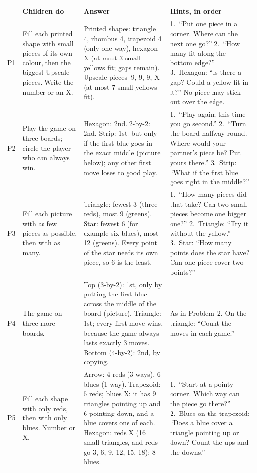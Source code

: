 \documentclass[10pt]{article}
\newcommand{\core}{\newline{\footnotesize core}}
\newcommand{\more}{\newline{\footnotesize further}}
\begin{document}
\needspace{2.5in}
{\small
\begin{xltabular}{\linewidth}{L{0.42in} L{1.45in} Y Y}
\toprule
& \textbf{Children do} & \textbf{Answer} & \textbf{Hints, in order}\\
\midrule
P1\core & Fill each printed shape with small pieces of its own colour, then the biggest Upscale pieces. Write the number or an X. &
Printed shapes: triangle 4, rhombus 4, trapezoid 4 (only one way), hexagon X (at most 3 small yellows fit; gaps remain).
Upscale pieces: 9, 9, 9, X (at most 7 small yellows fit). &
1.~``Put one piece in a corner. Where can the next one go?''
2.~``How many fit along the bottom edge?''
3.~Hexagon: ``Is there a gap? Could a yellow fit in it?'' No piece may stick out over the edge.\\
P2\core & Play the game on three boards; circle the player who can always win. &
Hexagon: 2nd. 2-by-2: 2nd. Strip: 1st, but only if the first blue goes in the exact middle (picture below); any other first move loses to good play. &
1.~``Play again; this time you go second.''
2.~``Turn the board halfway round. Where would your partner's piece be? Put yours there.''
3.~Strip: ``What if the first blue goes right in the middle?''\\
P3\core & Fill each picture with as few pieces as possible, then with as many. &
Triangle: fewest 3 (three reds), most 9 (greens).
Star: fewest 6 (for example six blues), most 12 (greens). Every point of the star needs its own piece, so 6 is the least. &
1.~``How many pieces did that take? Can two small pieces become one bigger one?''
2.~Triangle: ``Try it without the yellow.''
3.~Star: ``How many points does the star have? Can one piece cover two points?''\\
P4\core & The game on three more boards. &
Top (3-by-2): 1st, only by putting the first blue across the middle of the board (picture). Triangle: 1st; every first move wins, because the game always lasts exactly 3 moves. Bottom (4-by-2): 2nd, by copying. &
As in Problem~2. On the triangle: ``Count the moves in each game.''\\
P5\more & Fill each shape with only reds, then with only blues. Number or X. &
Arrow: 4 reds (3 ways), 6 blues (1 way).
Trapezoid: 5 reds; blues X: it has 9 triangles pointing up and 6 pointing down, and a blue covers one of each.
Hexagon: reds X (16 small triangles, and reds go 3, 6, 9, 12, 15, 18); 8 blues. &
1.~``Start at a pointy corner. Which way can the piece go there?''
2.~Blues on the trapezoid: ``Does a blue cover a triangle pointing up or down? Count the ups and the downs.''

\end{xltabular}}
\end{document}
